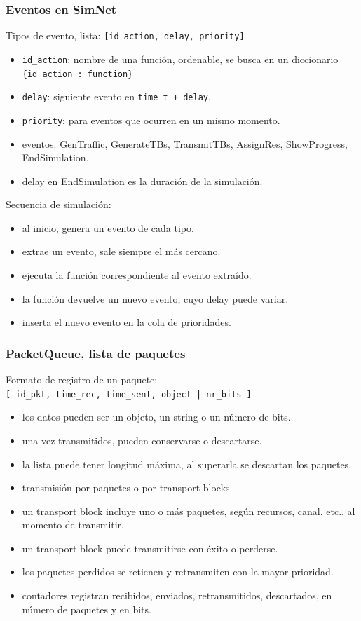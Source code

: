 \documentclass[spanish]{beamer}    %
\begin{document}
\begin{frame}
    \frametitle{Eventos en SimNet}
    Tipos de evento, lista: \texttt{[id\_action, delay, priority]}
    \begin{itemize}
        \item \texttt{id\_action}: nombre de una función, ordenable, se busca en un diccionario \texttt{ \{id\_action : function\} }
        \item \texttt{delay}: siguiente evento en \texttt{time\_t + delay}.
        \item \texttt{priority}: para eventos que ocurren en un mismo momento.
        \item eventos: GenTraffic, GenerateTBs, TransmitTBs, AssignRes, ShowProgress, EndSimulation.
        \item delay en EndSimulation es la duración de la simulación.
    \end{itemize}
    Secuencia de simulación:
    \begin{itemize}
        \item al inicio, genera un evento de cada tipo.
        \item extrae un evento, sale siempre el más cercano.
        \item ejecuta la función correspondiente al evento extraído.
        \item la función devuelve un nuevo evento, cuyo delay puede variar.
        \item inserta el nuevo evento en la cola de prioridades.
    \end{itemize}
\end{frame}


\begin{frame}
    \frametitle{PacketQueue, lista de paquetes}
    Formato de registro de un paquete:\\
        \texttt{[ id\_pkt, time\_rec, time\_sent, object | nr\_bits ]}
    \begin{itemize}
        \item los datos pueden ser un objeto, un string o un número de bits.
        \item una vez transmitidos, pueden conservarse o descartarse.
        \item la lista puede tener longitud máxima, al superarla se descartan los paquetes.
        \item transmisión por paquetes o por transport blocks.
        \item un transport block incluye uno o más paquetes, según recursos, canal, etc., al momento de transmitir.
        \item un transport block puede transmitirse con éxito o perderse.
        \item los paquetes perdidos se retienen y retransmiten con la mayor prioridad.
        \item contadores registran recibidos, enviados, retransmitidos, descartados, en número de paquetes y en bits.
    \end{itemize}
\end{frame}
\end{document}
